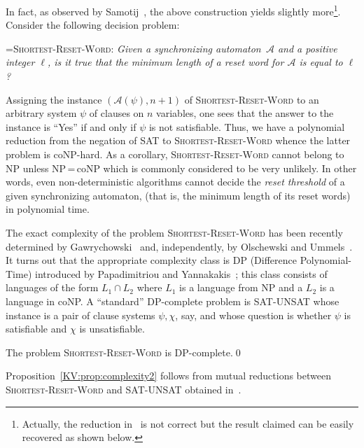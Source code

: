 \documentclass{irmaart}
\newcommand{\san}{synchronizing au\-tom\-a\-ton}
\newcommand{\sws}{reset words}
\newcommand{\rt}{reset threshold}
\theoremstyle{plain}
\begin{document}
In fact, as observed by Samotij~\cite{Samotij:2007}, the above construction
yields slightly more\footnote{Actually, the reduction in~\cite{Samotij:2007} is
not correct but the result claimed can be easily recovered as shown below.}.
Consider the following decision
problem:

\smallskip

\hangindent=\parindent \noindent \textsc{Shortest-Reset-Word:}
\emph{Given a \san\ $\mathcal{A}$ and a positive integer $\ell$,
is it true that the minimum length of a reset word for
$\mathcal{A}$ is equal to $\ell$?}

\smallskip

\noindent Assigning the instance $(\mathcal{A}(\psi),n+1)$ of
\textsc{Shortest-Reset-Word} to an arbitrary system $\psi$ of clauses on $n$
variables, one sees that the answer to the instance is ``Yes'' if and only if
$\psi$ is not satisfiable. Thus, we have a polynomial reduction from the
negation of \textsc{SAT} to \textsc{Shortest-Reset-Word} whence the latter
problem is \textsf{coNP}-hard. As a corollary, \textsc{Shortest-Reset-Word}
cannot belong to \textsf{NP} unless \textsf{NP}\,=\,\textsf{coNP} which is
commonly considered to be very unlikely. In other words, even non-deterministic
algorithms cannot decide the \emph{\rt} of a given \san,
(that is, the minimum length of its \sws) in polynomial time.

The exact complexity of the problem \textsc{Shortest-Reset-Word}
has been recently determined by
Gawrychowski~\cite{Gawrychowski:2008} and, independently, by
Olschewski and Ummels~\cite{Olschewski&Ummels:2010}. It turns out
that the appropriate complexity class is \textsf{DP}
(\textsf{Difference Polynomial-Time}) introduced by Papadimitriou
and Yannakakis~\cite{Papadimitriou&Yannakakis:1984}; this class
consists of languages of the form $L_1\cap L_2$ where $L_1$ is a
language from \textsf{NP} and a $L_2$ is a language in
\textsf{coNP}. A ``standard'' \textsf{DP}-complete problem is
\textsc{SAT-UNSAT} whose instance is a pair of clause systems
$\psi,\chi$, say, and whose question is whether $\psi$ is
satisfiable and $\chi$ is unsatisfiable.

\begin{proposition}
\label{KV:prop:complexity2} The problem \textsc{Shortest-Reset-Word} is
\textsf{DP}-complete.\qed
\end{proposition}

Proposition~\ref{KV:prop:complexity2} follows from mutual
reductions between \textsc{Shortest-Reset-Word} and
\textsc{SAT-UNSAT} obtained
in~\cite{Gawrychowski:2008,Olschewski&Ummels:2010}.
\end{document}

